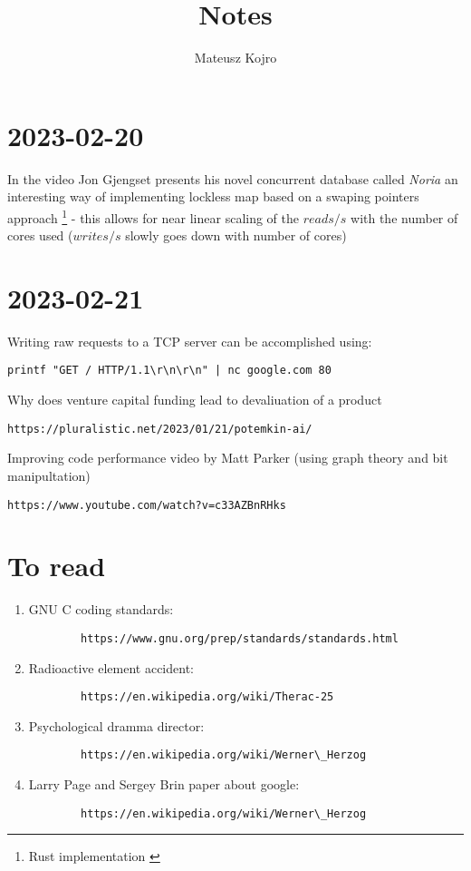 \documentclass{artikel3}
\title{Notes}
\date{}
\author{Mateusz Kojro}
\begin{document}
\maketitle

\section{2023-02-20}

In the video \cite{noria_yt} \cite{noria_slides} Jon Gjengset presents his novel concurrent database called \textit{Noria}\cite{noria} an interesting way of implementing lockless map based on a swaping pointers approach \footnote{Rust implementation \cite{evmap}} - this allows for near linear scaling of the $reads/s$ with the number of cores used ($writes/s$ slowly goes down with number of cores)

\section{2023-02-21}

Writing raw requests to a TCP server can be accomplished using:

\begin{verbatim}
printf "GET / HTTP/1.1\r\n\r\n" | nc google.com 80
\end{verbatim}

Why does venture capital funding lead to devaliuation of a product
\begin{verbatim}
https://pluralistic.net/2023/01/21/potemkin-ai/
\end{verbatim}

Improving code performance video by Matt Parker (using graph theory and bit manipultation)
\begin{verbatim}
https://www.youtube.com/watch?v=c33AZBnRHks
\end{verbatim}



\section*{To read}
\begin{enumerate}
	\item GNU C coding standards: 
		\begin{verbatim}
		https://www.gnu.org/prep/standards/standards.html
		\end{verbatim}
	\item Radioactive element accident:
		\begin{verbatim}
		https://en.wikipedia.org/wiki/Therac-25
		\end{verbatim}
	\item Psychological dramma director: 
		\begin{verbatim}
		https://en.wikipedia.org/wiki/Werner\_Herzog
		\end{verbatim}
	\item Larry Page and Sergey Brin paper about google: 
		\begin{verbatim}
		https://en.wikipedia.org/wiki/Werner\_Herzog
		\end{verbatim}
\end{enumerate}

\printbibliography
\end{document}
